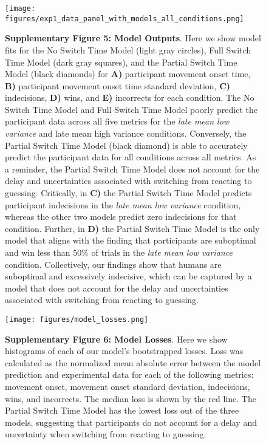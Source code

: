 \documentclass[12pt]{article}
\newcommand\boldblue[1]{\textcolor{mydarkblue}{\textbf{#1}}}
\begin{document}
\begin{figure}[H]
    \begin{minipage}[c]{0.6\textwidth}
        \texttt{[image: figures/exp1\_data\_panel\_with\_models\_all\_conditions.png]}
    \end{minipage}\hfill
    \begin{minipage}[c]{0.3\textwidth}
        \caption*{
            \boldblue{Supplementary Figure 5: Model Outputs}. Here we show model fits for the No Switch Time Model (light gray circles), Full Switch Time Model (dark gray squares), and the Partial Switch Time Model (black diamonds) for \boldblue{A)} participant movement onset time, \boldblue{B)} participant movement onset time standard deviation, \boldblue{C)} indecisions, \boldblue{D)} wins, and \boldblue{E)} incorrects for each condition. The No Switch Time Model and Full Switch Time Model poorly predict the participant data across all five metrics for the \emph{late mean low variance} and late mean high variance conditions. Conversely, the Partial Switch Time Model (black diamond) is able to accurately predict the participant data for all conditions across all metrics. As a reminder, the Partial Switch Time Model does not account for the delay and uncertainties associated with switching from reacting to guessing. Critically, in \boldblue{C)} the Partial Switch Time Model predicts participant indecisions in the \emph{late mean low variance} condition, whereas the other two models predict zero indecisions for that condition. Further, in \boldblue{D)} the Partial Switch Time Model is the only model that aligns with the finding that participants are suboptimal and win less than 50\% of trials in the \emph{late mean low variance} condition. Collectively, our findings show that humans are suboptimal and excessively indecisive, which can be captured by a model that does not account  for the delay and uncertainties associated with switching from reacting to guessing.
        } 
    \end{minipage}
\end{figure}

\begin{figure}[H]
    \centering 
    \texttt{[image: figures/model\_losses.png]}

        \caption*{
            \boldblue{Supplementary Figure 6: Model Losses}. Here we show histograms of each of our model’s bootstrapped losses. Loss was calculated as the normalized mean absolute error between the model prediction and experimental data for each of the following metrics: movement onset, movement onset standard deviation, indecisions, wins, and incorrects. The median loss is shown by the red line. The Partial Switch Time Model has the lowest loss out of the three models, suggesting that participants do not account for a delay and uncertainty when switching from reacting to guessing. 
        } 
\end{figure}
\end{document}
